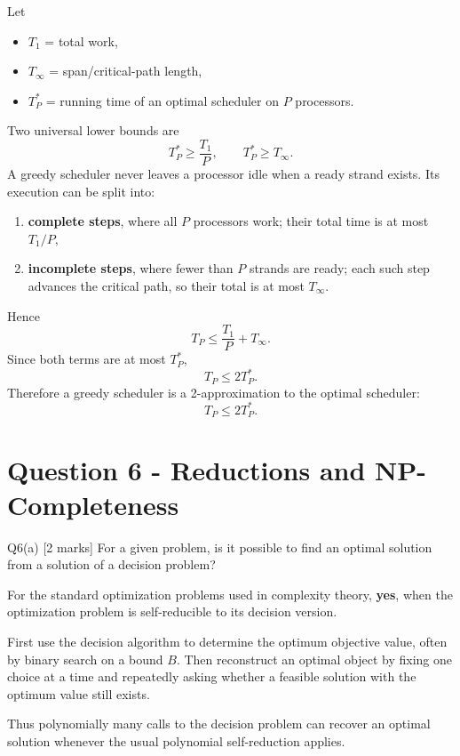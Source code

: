 \documentclass[10.5pt,a4paper]{article}
\begin{document}
\begin{answerbox}
Let
\begin{itemize}[leftmargin=6mm]
\item \(T_1\) = total work,
\item \(T_\infty\) = span/critical-path length,
\item \(T_P^*\) = running time of an optimal scheduler on \(P\) processors.
\end{itemize}
Two universal lower bounds are
\[
T_P^*\ge \frac{T_1}{P},\qquad T_P^*\ge T_\infty.
\]
A greedy scheduler never leaves a processor idle when a ready strand exists. Its execution can be split into:
\begin{enumerate}[leftmargin=6mm]
\item \textbf{complete steps}, where all \(P\) processors work; their total time is at most \(T_1/P\),
\item \textbf{incomplete steps}, where fewer than \(P\) strands are ready; each such step advances the critical path, so their total is at most \(T_\infty\).
\end{enumerate}
Hence
\[
T_P\le \frac{T_1}{P}+T_\infty.
\]
Since both terms are at most \(T_P^*\),
\[
T_P\le 2T_P^*.
\]
Therefore a greedy scheduler is a 2-approximation to the optimal scheduler:
\[
\boxed{T_P\le2T_P^*}.
\]
\end{answerbox}

\section{Question 6 - Reductions and NP-Completeness}

\begin{questionbox}{Q6(a) [2 marks]}
For a given problem, is it possible to find an optimal solution from a solution of a decision problem?
\end{questionbox}

\begin{answerbox}
For the standard optimization problems used in complexity theory, \textbf{yes}, when the optimization problem is self-reducible to its decision version.

First use the decision algorithm to determine the optimum objective value, often by binary search on a bound \(B\). Then reconstruct an optimal object by fixing one choice at a time and repeatedly asking whether a feasible solution with the optimum value still exists.

Thus polynomially many calls to the decision problem can recover an optimal solution whenever the usual polynomial self-reduction applies.
\end{answerbox}
\end{document}
